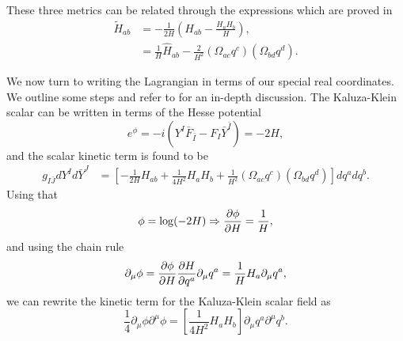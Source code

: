 These three metrics can be related through the expressions which are proved in \cite{Mohaupt:2011aa}
\begin{equation}
\label{eq:hattohes}
\begin{aligned}
\tilde{H}_{ab} &=  -\frac{1}{2H} \left(H_{ab} - \frac{H_aH_b}{H} \right), \\
               &= \frac{1}{H}\hat{H}_{ab} - \frac{2}{H^2} (\Omega_{ac}q^c)(\Omega_{bd}q^d).
\end{aligned}
\end{equation}

We now turn to writing the Lagrangian  in terms of our special real coordinates. We outline some steps and refer to \cite{Mohaupt:2011aa, Vaughan:2012} for an in-depth discussion. The Kaluza-Klein scalar can be written in terms of the Hesse potential
\begin{equation}
e^\phi = -i(Y^I \bar{F}_{\bar{I}} - F_I \bar{Y}^{\bar{I}}) = -2H,
\end{equation}
and the scalar kinetic term is found to be \cite{Mohaupt:2011aa}
\begin{equation}
\begin{aligned}
\label{eq:LA1}
g_{I\bar{J}} dY^I d\bar{Y}^J &= \left[-\frac{1}{2H}H_{ab} + \frac{1}{4H^2}H_aH_b + \frac{1}{H^2}(\Omega_{ac}q^c)(\Omega_{bd}q^d) \right]dq^a dq^b .
\end{aligned}
\end{equation}
Using that
\begin{equation}
\phi = \log (-2H) \Rightarrow \frac{\partial \phi}{\partial H} = \frac{1}{H},
\end{equation}
and using the chain rule
\begin{equation}
\partial_\mu \phi = \frac{\partial \phi}{\partial H} \frac{\partial H}{\partial q^a}\partial_\mu q^a = \frac{1}{H} H_a \partial_\mu q^a,
\end{equation}
we can rewrite the kinetic term for the Kaluza-Klein scalar field as
\begin{equation}
\label{eq:LA2}
\frac{1}{4} \partial_\mu \phi\partial^\mu \phi = \left[ \frac{1}{4H^2}H_aH_b \right] \partial_\mu q^a \partial^\mu q^b.
\end{equation}

